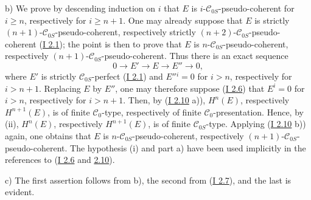 b) We prove by descending induction on $i$ that $E$ is $i$-$\mathcal C_{0S}$-pseudo-coherent for $i\ge n$, respectively for $i\ge n+1$. One may already suppose that $E$ is strictly $(n+1)$-$\mathcal C_{0S}$-pseudo-coherent, respectively strictly $(n+2)$-$\mathcal C_{0S}$-pseudo-coherent (\hyperlink{sga6.e01.def.2-1}{I 2.1}); the point is then to prove that $E$ is $n$-$\mathcal C_{0S}$-pseudo-coherent, respectively $(n+1)$-$\mathcal C_{0S}$-pseudo-coherent. Thus there is an exact sequence
\[
0\longrightarrow E'\longrightarrow E\longrightarrow E''\longrightarrow0,
\]
where $E'$ is strictly $\mathcal C_{0S}$-perfect (\hyperlink{sga6.e01.def.2-1}{I 2.1}) and $E''{}^i=0$ for $i>n$, respectively for $i>n+1$. Replacing $E$ by $E''$, one may therefore suppose (\hyperlink{sga6.e01.schol.2-6}{I 2.6}) that $E^i=0$ for $i>n$, respectively for $i>n+1$. Then, by (\hyperlink{sga6.e01.prop.2-10}{I 2.10} a)), $H^n(E)$, respectively $H^{n+1}(E)$, is of finite $\mathcal C_0$-type, respectively of finite $\mathcal C_0$-presentation. Hence, by (ii), $H^n(E)$, respectively $H^{n+1}(E)$, is of finite $\mathcal C_{0S}$-type. Applying (\hyperlink{sga6.e01.prop.2-10}{I 2.10} b)) again, one obtains that $E$ is $n$-$\mathcal C_{0S}$-pseudo-coherent, respectively $(n+1)$-$\mathcal C_{0S}$-pseudo-coherent. The hypothesis (i) and part a) have been used implicitly in the references to (\hyperlink{sga6.e01.schol.2-6}{I 2.6} and \hyperlink{sga6.e01.prop.2-10}{2.10}).

c) The first assertion follows from b), the second from (\hyperlink{sga6.e01.prop.2-7}{I 2.7}), and the last is evident.


